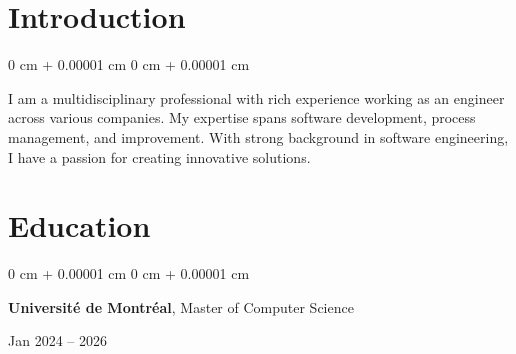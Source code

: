 \documentclass[10pt, letterpaper]{article}
\newenvironment{highlights}{
    \begin{itemize}[
        topsep=0.10 cm,
        parsep=0.10 cm,
        partopsep=0pt,
        itemsep=0pt,
        leftmargin=0 cm + 10pt
    ]
}{
    \end{itemize}
} %
\newenvironment{highlightsforbulletentries}{
    \begin{itemize}[
        topsep=0.10 cm,
        parsep=0.10 cm,
        partopsep=0pt,
        itemsep=0pt,
        leftmargin=10pt
    ]
}{
    \end{itemize}
} %
\newenvironment{onecolentry}{
    \begin{adjustwidth}{
        0 cm + 0.00001 cm
    }{
        0 cm + 0.00001 cm
    }
}{
    \end{adjustwidth}
} %
\newenvironment{twocolentry}[2][]{
    \onecolentry
    \def\secondColumn{#2}
    \setcolumnwidth{\fill, 6.5 cm}
    \begin{paracol}{2}
}{
    \switchcolumn \raggedleft \secondColumn
    \end{paracol}
    \endonecolentry
} %
\begin{document}







    \section{Introduction}
        \begin{onecolentry}
            I am a multidisciplinary professional with rich experience working as an engineer across various companies. My expertise spans software development, process management, and improvement. With strong background in software engineering, I have a passion for creating innovative solutions.
        \end{onecolentry}


    \section{Education} 
        \begin{twocolentry}{
            Jan 2024 – 2026
        }
            \textbf{Université de Montréal}, Master of Computer Science
        \end{twocolentry}

\end{document}
